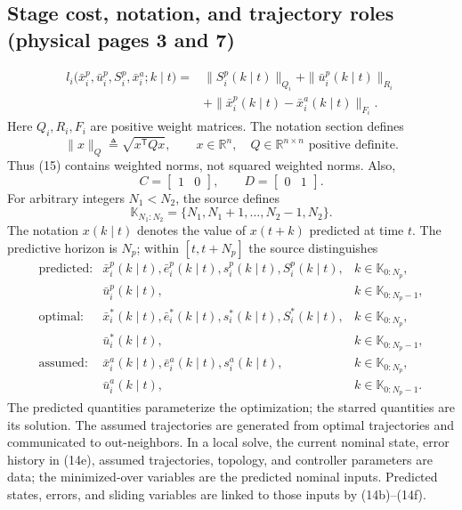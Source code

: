 \documentclass{article}
\begin{document}
\subsection*{Stage cost, notation, and trajectory roles (physical pages 3 and 7)}
\begin{equation}
\begin{split}
l_i\bigl(\bar x_i^p,\bar u_i^p,S_i^p,\bar x_i^a;k\mid t\bigr)
={}&\|S_i^p(k\mid t)\|_{Q_i}
 +\|\bar u_i^p(k\mid t)\|_{R_i}\\
&+\|\bar x_i^p(k\mid t)-\bar x_i^a(k\mid t)\|_{F_i}.
\end{split}\tag{15}
\end{equation}
Here $Q_i,R_i,F_i$ are positive weight matrices. The notation section defines
\[
\|x\|_Q\triangleq\sqrt{x^{\mathsf T}Qx},
\qquad x\in\mathbb R^n,\quad Q\in\mathbb R^{n\times n}
\text{ positive definite}.
\]
Thus (15) contains weighted norms, not squared weighted norms. Also,
\[
C=\begin{bmatrix}1&0\end{bmatrix},\qquad
D=\begin{bmatrix}0&1\end{bmatrix}.
\]
For arbitrary integers $N_1<N_2$, the source defines
\[
\mathbb K_{N_1:N_2}=\{N_1,N_1+1,\ldots,N_2-1,N_2\}.
\]
The notation $x(k\mid t)$ denotes the value of $x(t+k)$ predicted at time $t$. The predictive horizon is $N_p$; within $[t,t+N_p]$ the source distinguishes
\[
\begin{array}{lll}
\text{predicted:}&
\bar x_i^p(k\mid t),\bar e_i^p(k\mid t),s_i^p(k\mid t),S_i^p(k\mid t),
&k\in\mathbb K_{0:N_p},\\
&\bar u_i^p(k\mid t),&k\in\mathbb K_{0:N_p-1},\\[2pt]
\text{optimal:}&
\bar x_i^*(k\mid t),\bar e_i^*(k\mid t),s_i^*(k\mid t),S_i^*(k\mid t),
&k\in\mathbb K_{0:N_p},\\
&\bar u_i^*(k\mid t),&k\in\mathbb K_{0:N_p-1},\\[2pt]
\text{assumed:}&
\bar x_i^a(k\mid t),\bar e_i^a(k\mid t),s_i^a(k\mid t),
&k\in\mathbb K_{0:N_p},\\
&\bar u_i^a(k\mid t),&k\in\mathbb K_{0:N_p-1}.
\end{array}
\]
The predicted quantities parameterize the optimization; the starred quantities are its solution. The assumed trajectories are generated from optimal trajectories and communicated to out-neighbors. In a local solve, the current nominal state, error history in (14e), assumed trajectories, topology, and controller parameters are data; the minimized-over variables are the predicted nominal inputs. Predicted states, errors, and sliding variables are linked to those inputs by (14b)--(14f).
\end{document}
